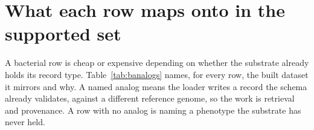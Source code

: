 
\section{What each row maps onto in the supported set}\label{sec:analogs}

A bacterial row is cheap or expensive depending on whether the substrate already holds its
record type. Table~\ref{tab:banalogs} names, for every row, the built 
dataset it mirrors and why. A named analog means the loader writes a record the schema
already validates, against a different reference genome, so the work is retrieval and
provenance. A row with no analog is naming a phenotype the substrate has never held.


